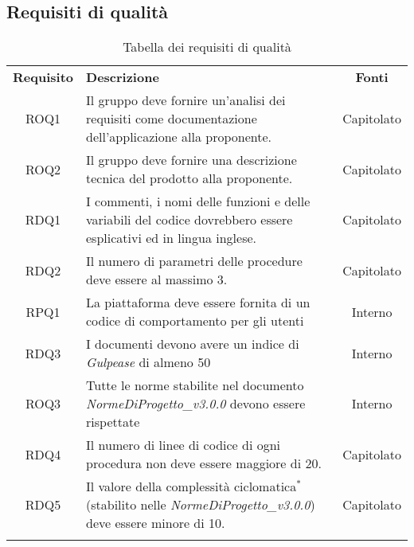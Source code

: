 \subsection{Requisiti di qualità}
\begin{longtable}{| c | p{10cm} | c |}
		\rowcolor{LightBlue}
		\color{white}\bfseries Requisito & \color{white}\bfseries Descrizione & \color{white}\bfseries Fonti\\[0.25cm]
		ROQ1 & Il gruppo deve fornire un'analisi dei requisiti come documentazione dell'applicazione alla proponente. & Capitolato \\
		ROQ2 & Il gruppo deve fornire una descrizione tecnica del prodotto alla proponente. & Capitolato \\ 
		RDQ1 & I commenti, i nomi delle funzioni e delle variabili del codice dovrebbero essere esplicativi ed in lingua inglese. & Capitolato \\ 
		RDQ2 & Il numero di parametri delle procedure deve essere al massimo 3. & Capitolato \\
		RPQ1 & La piattaforma deve essere fornita di un codice di comportamento per gli utenti & Interno\\
		RDQ3 & I documenti devono avere un indice di \textit{Gulpease} di almeno 50 & Interno\\
		ROQ3 & Tutte le norme stabilite nel documento \textit{NormeDiProgetto\_v3.0.0} devono essere rispettate & Interno\\
		RDQ4 & Il numero di linee di codice di ogni procedura non deve essere maggiore di 20. & Capitolato\\
		RDQ5 & Il valore della complessità ciclomatica$^*$ (stabilito nelle \textit{NormeDiProgetto\_v3.0.0}) deve essere minore di 10. & Capitolato\\
		\hline
		\caption{Tabella dei requisiti di qualità}
\end{longtable}